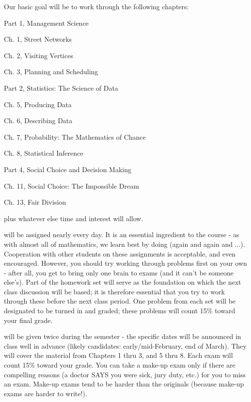 \ni Our basic goal will be to work through the following chapters:

\ssk

Part 1, Management Science

\hsk Ch. 1, Street Networks

\hsk Ch. 2, Visiting Vertices

\hsk Ch. 3, Planning and Scheduling

Part 2, Statistics: The Science of Data

\hsk Ch. 5, Producing Data

\hsk Ch. 6, Describing Data


\hsk Ch. 7, Probability: The Mathematics of Chance

\hsk Ch. 8, Statistical Inference

Part 4, Social Choice and Decision Making

\hsk Ch. 11, Social Choice: The Impossible Dream

\hsk Ch. 13, Fair Division

\ssk

\ni plus whatever else time and interest will allow.

\ssk

 will be assigned nearly every day. 
It is an essential ingredient to the course - as with almost all of 
mathematics, we learn best by doing (again and again and ...). Cooperation 
with other students on these assignments is acceptable, and even 
encouraged. However, you should try working through problems first on your 
own - after 
all, you get to bring only one brain to exams (and it can't be someone 
else's). Part of the homework set will serve as the foundation on which the next
class discussion will be based; it is therefore essential that you try to work 
through these 
before the next class period. One problem from each set will be designated to 
be turned in and graded; these problems will count 15\% toward your final grade.

\ssk

 will be given twice during the 
semester - the specific dates will 
be announced in class well in advance (likely candidates: early/mid-February, 
end of March). They will cover the material from Chapters 1 thru 3, and 5 thru 8. 
Each exam will count 15\% toward your grade. 
You can take a make-up exam only if there are compelling reasons (a doctor SAYS 
you were sick, jury duty, etc.) for you to miss an exam. Make-up 
exams tend to be harder than the originals (because make-up exams 
are harder to write!).

